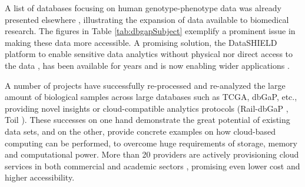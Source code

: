 \documentclass[letter]{bioinfo}
\begin{document}
A list of databases focusing on human genotype-phenotype data was already presented elsewhere \citep{Brookes:2015:Human}, illustrating the expansion of data available to biomedical research. The figures in Table \ref{tab:dbgapSubject} exemplify a prominent issue in making these data more accessible. A promising solution, the DataSHIELD platform to enable sensitive data analytics without physical nor direct access to the data \citep{Gaye:2014:DataSHIELD}, has been available for years and is now enabling wider applications \citep{Wilson:2017:DataSHIELD}.

A number of projects have successfully re-processed and re-analyzed the large amount of biological samples across large databases such as TCGA, dbGaP, etc., providing novel insights or cloud-compatible analytics protocols (Rail-dbGaP \citep{Nellore:2016:RaildbGaP}, Toil \citep{Vivian:2017:Toil}). These successes on one hand demonstrate the great potential of existing data sets, and on the other, provide concrete examples on how cloud-based computing can be performed, to overcome huge requirements of storage, memory and computational power. More than 20 providers are actively provisioning cloud services in both commercial and academic sectors \citep{Langmead:2018:Cloud}, promising even lower cost and higher accessibility.
\end{document}
